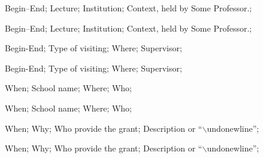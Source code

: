 \addteaching%
{%
    Begin--End;%
    Lecture;%
    Institution;%
    Context, held by Some Professor.;%
}%

\addteaching%
{%
    Begin--End;%
    Lecture;%
    Institution;%
    Context, held by Some Professor.;%
}%


\addvisit%
{%
    Begin-End;%
    Type of visiting;%
    Where;%
    Supervisor;%
}%

\addvisit%
{%
    Begin-End;%
    Type of visiting;%
    Where;%
    Supervisor;%
}%

\addtraining%
{%
    When;%
    School name;%
    Where;%
    Who;%
}%

\addtraining%
{%
    When;%
    School name;%
    Where;%
    Who;%
}%

\addhonour%
{%
    When;%
    Why;%
    Who provide the grant;%
    Description or ``$\backslash$undonewline'';%
}%

\addhonour%
{%
    When;%
    Why;%
    Who provide the grant;%
    Description or ``$\backslash$undonewline'';%
}%
